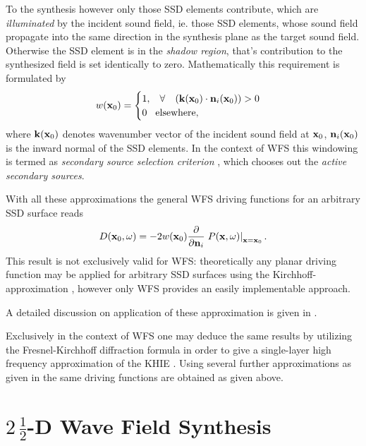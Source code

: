 To the synthesis however only those SSD elements contribute, which are \emph{illuminated} by the incident sound field, ie. those SSD elements, whose sound field propagate into the same direction in the synthesis plane as the target sound field. Otherwise the SSD element is in the \emph{shadow region}, that's contribution to the synthesized field is set identically to zero.
Mathematically this requirement is formulated by
\begin{equation}
w(\mathbf{x}_0) = \begin{cases}
                        1, \hspace{3mm} \forall \hspace{3mm} \left( \mathbf{k}(\mathbf{x}_0) \cdot \mathbf{n}_i(\mathbf{x}_0) \right) > 0 \\
                        0  \hspace{3mm} \text{elsewhere},
                    \end{cases}
\end{equation}
where $\mathbf{k}(\mathbf{x}_0)$ denotes wavenumber vector of the incident sound field at $\mathbf{x}_0$, $ \mathbf{n}_i(\mathbf{x}_0)$ is the inward normal of the SSD elements.
In the context of WFS this windowing is termed as \emph{secondary source selection criterion} \cite{Spors2007, Spors2007:DAGA:SS_selection_criterion}, which chooses out the \emph{active secondary sources}.

With all these approximations the general WFS driving functions for an arbitrary SSD surface reads
\begin{equation}
D(\mathbf{x}_0,\omega) = -2 w(\mathbf{x}_0) \frac{\partial}{\partial \mathbf{n}_i} \left. P(\mathbf{x},\omega) \right|_{\mathbf{x} = \mathbf{x}_0}.
\end{equation}
This result is not exclusively valid for WFS: theoretically any planar driving function may be applied for arbitrary SSD surfaces using the Kirchhoff-approximation \cite{Ahrens2012}, however only WFS provides an easily implementable approach.

A detailed discussion on application of these approximation is given in \cite[Sec. 3.8]{Ahrens2012}.

Exclusively in the context of WFS one may deduce the same results by utilizing the Fresnel-Kirchhoff diffraction formula in order to give a single-layer high frequency approximation of the KHIE \cite[p. 215.]{Pierce1991}. Using several further approximations as given in \cite{Zotter2013:uniqueness} the same driving functions are obtained as given above.

\section{$2\, \frac{1}{2}$-D Wave Field Synthesis}

